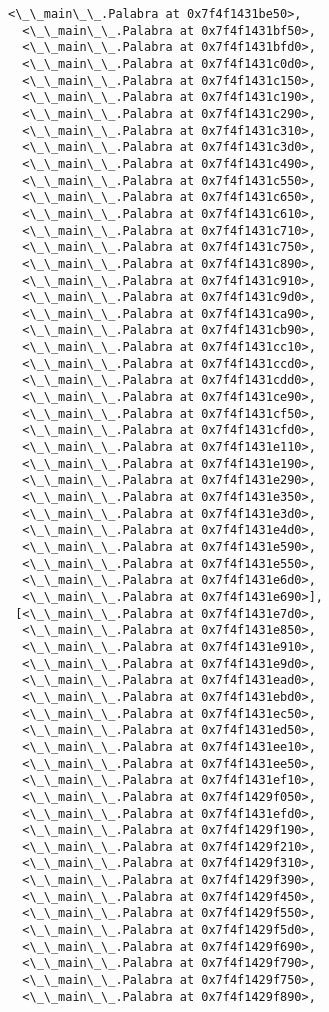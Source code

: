 \documentclass[12pt,a4paper,table]{article}
\begin{document}
\begin{tcolorbox}[breakable, size=fbox, boxrule=.5pt, pad at break*=1mm, opacityfill=0]
\begin{Verbatim}[commandchars=\\\{\}]
  <\_\_main\_\_.Palabra at 0x7f4f1431be50>,
  <\_\_main\_\_.Palabra at 0x7f4f1431bf50>,
  <\_\_main\_\_.Palabra at 0x7f4f1431bfd0>,
  <\_\_main\_\_.Palabra at 0x7f4f1431c0d0>,
  <\_\_main\_\_.Palabra at 0x7f4f1431c150>,
  <\_\_main\_\_.Palabra at 0x7f4f1431c190>,
  <\_\_main\_\_.Palabra at 0x7f4f1431c290>,
  <\_\_main\_\_.Palabra at 0x7f4f1431c310>,
  <\_\_main\_\_.Palabra at 0x7f4f1431c3d0>,
  <\_\_main\_\_.Palabra at 0x7f4f1431c490>,
  <\_\_main\_\_.Palabra at 0x7f4f1431c550>,
  <\_\_main\_\_.Palabra at 0x7f4f1431c650>,
  <\_\_main\_\_.Palabra at 0x7f4f1431c610>,
  <\_\_main\_\_.Palabra at 0x7f4f1431c710>,
  <\_\_main\_\_.Palabra at 0x7f4f1431c750>,
  <\_\_main\_\_.Palabra at 0x7f4f1431c890>,
  <\_\_main\_\_.Palabra at 0x7f4f1431c910>,
  <\_\_main\_\_.Palabra at 0x7f4f1431c9d0>,
  <\_\_main\_\_.Palabra at 0x7f4f1431ca90>,
  <\_\_main\_\_.Palabra at 0x7f4f1431cb90>,
  <\_\_main\_\_.Palabra at 0x7f4f1431cc10>,
  <\_\_main\_\_.Palabra at 0x7f4f1431ccd0>,
  <\_\_main\_\_.Palabra at 0x7f4f1431cdd0>,
  <\_\_main\_\_.Palabra at 0x7f4f1431ce90>,
  <\_\_main\_\_.Palabra at 0x7f4f1431cf50>,
  <\_\_main\_\_.Palabra at 0x7f4f1431cfd0>,
  <\_\_main\_\_.Palabra at 0x7f4f1431e110>,
  <\_\_main\_\_.Palabra at 0x7f4f1431e190>,
  <\_\_main\_\_.Palabra at 0x7f4f1431e290>,
  <\_\_main\_\_.Palabra at 0x7f4f1431e350>,
  <\_\_main\_\_.Palabra at 0x7f4f1431e3d0>,
  <\_\_main\_\_.Palabra at 0x7f4f1431e4d0>,
  <\_\_main\_\_.Palabra at 0x7f4f1431e590>,
  <\_\_main\_\_.Palabra at 0x7f4f1431e550>,
  <\_\_main\_\_.Palabra at 0x7f4f1431e6d0>,
  <\_\_main\_\_.Palabra at 0x7f4f1431e690>],
 [<\_\_main\_\_.Palabra at 0x7f4f1431e7d0>,
  <\_\_main\_\_.Palabra at 0x7f4f1431e850>,
  <\_\_main\_\_.Palabra at 0x7f4f1431e910>,
  <\_\_main\_\_.Palabra at 0x7f4f1431e9d0>,
  <\_\_main\_\_.Palabra at 0x7f4f1431ead0>,
  <\_\_main\_\_.Palabra at 0x7f4f1431ebd0>,
  <\_\_main\_\_.Palabra at 0x7f4f1431ec50>,
  <\_\_main\_\_.Palabra at 0x7f4f1431ed50>,
  <\_\_main\_\_.Palabra at 0x7f4f1431ee10>,
  <\_\_main\_\_.Palabra at 0x7f4f1431ee50>,
  <\_\_main\_\_.Palabra at 0x7f4f1431ef10>,
  <\_\_main\_\_.Palabra at 0x7f4f1429f050>,
  <\_\_main\_\_.Palabra at 0x7f4f1431efd0>,
  <\_\_main\_\_.Palabra at 0x7f4f1429f190>,
  <\_\_main\_\_.Palabra at 0x7f4f1429f210>,
  <\_\_main\_\_.Palabra at 0x7f4f1429f310>,
  <\_\_main\_\_.Palabra at 0x7f4f1429f390>,
  <\_\_main\_\_.Palabra at 0x7f4f1429f450>,
  <\_\_main\_\_.Palabra at 0x7f4f1429f550>,
  <\_\_main\_\_.Palabra at 0x7f4f1429f5d0>,
  <\_\_main\_\_.Palabra at 0x7f4f1429f690>,
  <\_\_main\_\_.Palabra at 0x7f4f1429f790>,
  <\_\_main\_\_.Palabra at 0x7f4f1429f750>,
  <\_\_main\_\_.Palabra at 0x7f4f1429f890>,

\end{Verbatim}
\end{tcolorbox}
\end{document}
